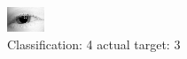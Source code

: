 \begin{figure}[h!]
\begin{center}
\includegraphics[width=0.60\columnwidth]{figures/ID19_class_4_target_3.png}
\end{center}
\caption{ Classification: 4 actual target: 3}
\label{fig:ID19_class_4_target_3}
\end{figure}
